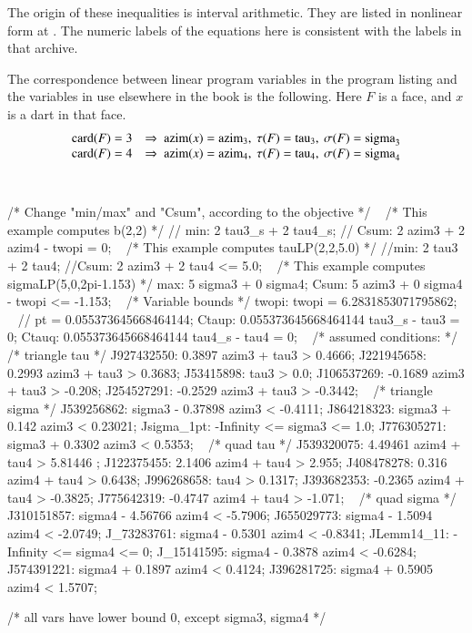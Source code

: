 The origin of these inequalities is interval arithmetic.  They are
listed in nonlinear form at \cite{web}.  The numeric labels of the
equations here is consistent with the labels in that archive.

The correspondence between linear program variables in the program
listing and the variables in use elsewhere in the book is the
following.  Here $F$ is a face, and $x$ is a dart in that face.
    $$
    \begin{array}{lll}
    \card(F)=3 &\Rightarrow\  \azim(x)=\azim_3,\ \tau(F)=\op{tau}_3,\ \sigma(F)=\op{sigma}_3\\
    \card(F)=4 &\Rightarrow\  \azim(x)=\azim_4,\ \tau(F)=\op{tau}_4,\ \sigma(F)=\op{sigma}_4\\
    \end{array}
    $$

{ \obeylines\tt
  \hbox{}\parindent=4pt

 /* Change  "min/max" and "Csum", according to the objective */
 \ \hbox{}
 /* This example computes b(2,2) */
 // min: 2 tau3\_s + 2 tau4\_s;
 // Csum: 2 azim3 + 2 azim4 - twopi = 0;
 \ \hbox{}
 /* This example computes tauLP(2,2,5.0) */
 //min: 2 tau3 + 2 tau4;
 //Csum: 2 azim3 + 2 tau4 <= 5.0;
 \ \hbox{}
 /* This example computes sigmaLP(5,0,2pi-1.153) */
 max: 5 sigma3 + 0 sigma4;
 Csum: 5 azim3 + 0 sigma4 - twopi <= -1.153;
 \ \hbox{}
 /* Variable bounds */
 twopi: twopi =  6.2831853071795862;
 \ \hbox{}
 // pt = 0.055373645668464144;
 Ctaup: 0.055373645668464144 tau3\_s - tau3 = 0;
 Ctauq: 0.055373645668464144 tau4\_s - tau4 = 0;
 \ \hbox{}
 /* assumed conditions: */
 /* triangle tau */
 J927432550: 0.3897 azim3 + tau3 > 0.4666;
 J221945658: 0.2993 azim3 + tau3 > 0.3683;
 J53415898:  tau3 > 0.0;
 J106537269: -0.1689 azim3 + tau3 > -0.208;
 J254527291: -0.2529 azim3 + tau3 > -0.3442;
 \ \hbox{}
 /* triangle sigma */
 J539256862: sigma3 - 0.37898 azim3 < -0.4111;
 J864218323: sigma3 + 0.142 azim3 < 0.23021;
 Jsigma\_1pt: -Infinity <= sigma3 <= 1.0;
 J776305271: sigma3 + 0.3302 azim3 < 0.5353;
 \ \hbox{}
 /* quad  tau */
 J539320075: 4.49461 azim4 + tau4 > 5.81446 ;
 J122375455: 2.1406 azim4 + tau4 > 2.955;
 J408478278: 0.316 azim4 + tau4 > 0.6438;
 J996268658: tau4 > 0.1317;
 J393682353: -0.2365 azim4 + tau4 > -0.3825;
 J775642319: -0.4747 azim4 + tau4 > -1.071;
 \ \hbox{}
 /* quad sigma */
 J310151857: sigma4 - 4.56766 azim4 < -5.7906;
 J655029773: sigma4 - 1.5094 azim4 < -2.0749;
 J\_73283761:  sigma4 - 0.5301 azim4 < -0.8341;
 JLemm14\_11: -Infinity <= sigma4 <= 0;
 J\_15141595:  sigma4 - 0.3878 azim4 < -0.6284;
 J574391221: sigma4 + 0.1897 azim4 < 0.4124;
 J396281725: sigma4 + 0.5905 azim4 < 1.5707;
 \ \hbox{}

 /* all vars have lower bound 0, except sigma3, sigma4  */


}

